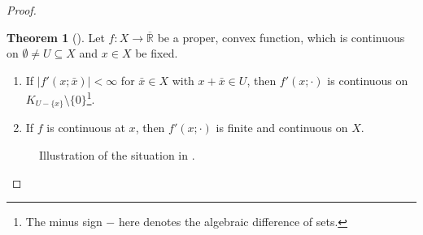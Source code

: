 \documentclass[10pt, leqno]{amsart}
\theoremstyle{definition}
\newtheorem{theorem}{Theorem}[section]
\theoremstyle{remark}
\begin{document}
\begin{proof}
\begin{enumerate}[label=(\roman*), wide]
\begin{enumerate}[label=(\alph*), wide]
                \begin{edgebox}
                    \begin{theorem}[{\cite[pp. 195-196]{IoffeTihomirov}}] \label{point_directional_derivative_continuity_theorem}
                        Let \(f\colon X \to \overline{\mathbb{R}}\) be a proper, convex function, which is continuous on \(\emptyset \neq U \subseteq X\) and \(x \in X\) be fixed.
                        \begin{enumerate}[label=(\roman*), wide]
                            \item \label{point_directional_derivative_continuity_theorem_1} If \(|f'(x; \bar{x})| < \infty\) for \(\bar{x} \in X\) with \(x+\bar{x} \in U\), then \(f'(x; \cdot)\) is continuous on \(K_{U - \{x\}} \setminus \{0\}\)\footnote{The minus sign \(-\) here denotes the algebraic difference of sets.}.
                            \item \label{point_directional_derivative_continuity_theorem_2} If \(f\) is continuous at \(x\), then \(f'(x; \cdot)\) is finite and continuous on \(X\).
                        \end{enumerate}
                    \end{theorem}
                \end{edgebox}
    
                \begin{figure}[!hbtp]
                    \centering
                    \caption{Illustration of the situation in .}
                \end{figure}
                

\end{enumerate}
\end{enumerate}
\end{proof}
\end{document}
